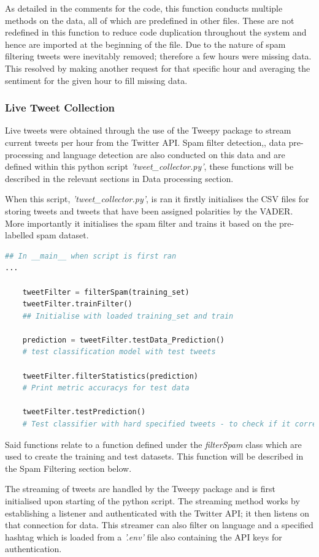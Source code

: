 \documentclass[oneside, 12pt]{article}
\begin{document}
			As detailed in the comments for the code, this function conducts multiple methods on the data, all of which are predefined in other files. These are not redefined in this function to reduce code duplication throughout the system and hence are imported at the beginning of the file. Due to the nature of spam filtering tweets were inevitably removed; therefore a few hours were missing data. This resolved by making another request for that specific hour and averaging the sentiment for the given hour to fill missing data.
			
			\subsubsection{Live Tweet Collection}
			Live tweets were obtained through the use of the Tweepy package to stream current tweets per hour from the Twitter API. Spam filter detection,, data pre-processing and language detection are also conducted on this data and are defined within this python script \textit{'tweet\_collector.py'}, these functions will be described in the relevant sections in Data processing section.
			
			When this script, \textit{'tweet\_collector.py'}, is ran it firstly initialises the CSV files for storing tweets and tweets that have been assigned polarities by the VADER. More importantly it initialises the spam filter and trains it based on the pre-labelled spam dataset.
			\begin{lstlisting}[language=python, caption=Spam filter initialisation and training functions]
## In __main__ when script is first ran
...
			
	tweetFilter = filterSpam(training_set)
	tweetFilter.trainFilter()
	## Initialise with loaded training_set and train
			
	prediction = tweetFilter.testData_Prediction()
	# test classification model with test tweets
			
	tweetFilter.filterStatistics(prediction)
	# Print metric accuracys for test data
			
	tweetFilter.testPrediction()
	# Test classifier with hard specified tweets - to check if it correctly classifies
			\end{lstlisting}
			
			Said functions relate to a function defined under the \textit{filterSpam} class which are used to create the training and test datasets. This function will be described in the Spam Filtering section below.
			
			The streaming of tweets are handled by the Tweepy package and is first initialised upon starting of the python script. The streaming method works by establishing a listener and authenticated with the Twitter API; it then listens on that connection for data. This streamer can also filter on language and a specified hashtag which is loaded from a \textit{'.env'} file also containing the API keys for authentication.
			\newline
			
\end{document}
